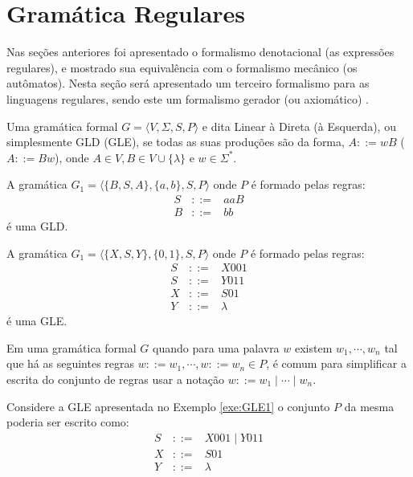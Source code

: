\section{Gramática Regulares}\label{sec:GramaticaRegular}

Nas seções anteriores foi apresentado o formalismo denotacional (as expressões regulares), e mostrado sua equivalência com o formalismo mecânico (os autômatos). Nesta seção será apresentado um terceiro formalismo para as linguagens regulares, sendo este um formalismo gerador (ou axiomático) \cite{menezes1998LFA}. 

\begin{definicao}\label{def:GramaticaLinear}
	Uma gramática formal $G = \langle V, \Sigma, S, P \rangle$ e dita Linear à Direta (à Esquerda), ou simplesmente GLD (GLE), se todas as suas produções são da forma, $A ::= wB$ ($A ::= Bw$), onde $A \in V, B \in V \cup \{\lambda\}$ e $w \in \Sigma^*$.
\end{definicao}

\begin{exemplo}
	A gramática $G_1 = \langle \{B, S , A\}, \{a, b\}, S, P \rangle$ onde $P$ é formado pelas regras:
	\begin{eqnarray*}
		S & ::= & aaB\\
		B & ::= & bb
	\end{eqnarray*}
	é uma GLD.
\end{exemplo}

\begin{exemplo}\label{exe:GLE1}
	A gramática $G_1 = \langle \{X, S , Y\}, \{0, 1\}, S, P \rangle$ onde $P$ é formado pelas regras:
	\begin{eqnarray*}
		S & ::= & X001\\
		S & ::= & Y011\\
		X & ::= & S01\\
		Y & ::= & \lambda
	\end{eqnarray*}
	é uma GLE.
\end{exemplo}

Em uma gramática formal $G$ quando para uma palavra $w$ existem $w_1, \cdots, w_n$ tal que há as seguintes regras $w ::= w_1, \cdots, w ::= w_n \in P$, é comum para simplificar a escrita do conjunto de regras usar a notação $w ::= w_1 \mid \cdots \mid w_n$. 

\begin{exemplo}\label{exe:GLE}
	Considere a GLE apresentada no Exemplo \ref{exe:GLE1} o conjunto $P$ da mesma poderia ser escrito como:
	\begin{eqnarray*}
		S & ::= & X001 \mid Y011\\
		X & ::= & S01\\
		Y & ::= & \lambda
	\end{eqnarray*}
\end{exemplo}

